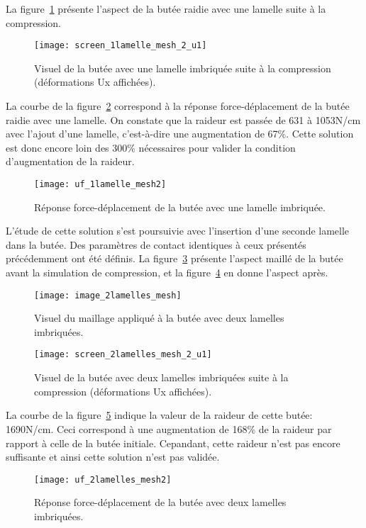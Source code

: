 ﻿\documentclass{article}
\newcommand{\cimg}{0.8}
\begin{document}
La figure~\ref{fig8} présente l'aspect de la butée raidie avec une lamelle suite à la compression.

\begin{figure}[!h]
	\centering
	\texttt{[image: screen\_1lamelle\_mesh\_2\_u1]}
	\caption{Visuel de la butée avec une lamelle imbriquée suite à la compression (déformations Ux affichées).}
	\label{fig8}
\end{figure}

La courbe de la figure~\ref{fig9} correspond à la réponse force-déplacement de la butée raidie avec une lamelle. On constate que la raideur est passée de 631 à 1053N/cm avec l'ajout d'une lamelle, c'est-à-dire une augmentation de 67\%. Cette solution est donc encore loin des 300\% nécessaires pour valider la condition d'augmentation de la raideur.

\begin{figure}[!h]
	\centering
	\texttt{[image: uf\_1lamelle\_mesh2]}
	\caption{Réponse force-déplacement de la butée avec une lamelle imbriquée.}
	\label{fig9}
\end{figure}

L'étude de cette solution s'est poursuivie avec l'insertion d'une seconde lamelle dans la butée. Des paramètres de contact identiques à ceux présentés précédemment ont été définis. La figure~\ref{fig10} présente l'aspect maillé de la butée avant la simulation de compression, et la figure~\ref{fig11} en donne l'aspect après.

\begin{figure}[!h]
	\centering
	\texttt{[image: image\_2lamelles\_mesh]}
	\caption{Visuel du maillage appliqué à la butée avec deux lamelles imbriquées.}
	\label{fig10}
\end{figure}

\begin{figure}[!h]
	\centering
	\texttt{[image: screen\_2lamelles\_mesh\_2\_u1]}
	\caption{Visuel de la butée avec deux lamelles imbriquées suite à la compression (déformations Ux affichées).}
	\label{fig11}
\end{figure}

La courbe de la figure~\ref{fig12} indique la valeur de la raideur de cette butée: 1690N/cm. Ceci correspond à une augmentation de 168\% de la raideur par rapport à celle de la butée initiale. Cepandant, cette raideur n'est pas encore suffisante et ainsi cette solution n'est pas validée.
 
\begin{figure}[!h]
	\centering
	\texttt{[image: uf\_2lamelles\_mesh2]}
	\caption{Réponse force-déplacement de la butée avec deux lamelles imbriquées.}
	\label{fig12}
\end{figure}
\end{document}

